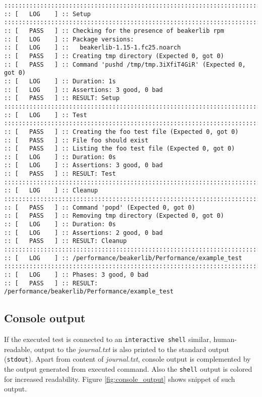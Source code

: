 \begin{minipage}{\linewidth}
\begin{lstlisting}[style=txt,caption={Example of journal.txt},label={lst:journaltxt_example}]
::::::::::::::::::::::::::::::::::::::::::::::::::::::::::::::::::::::::::::::::
:: [   LOG    ] :: Setup
::::::::::::::::::::::::::::::::::::::::::::::::::::::::::::::::::::::::::::::::
:: [   PASS   ] :: Checking for the presence of beakerlib rpm 
:: [   LOG    ] :: Package versions:
:: [   LOG    ] ::   beakerlib-1.15-1.fc25.noarch
:: [   PASS   ] :: Creating tmp directory (Expected 0, got 0)
:: [   PASS   ] :: Command 'pushd /tmp/tmp.3iXfiT4GiR' (Expected 0, got 0)
:: [   LOG    ] :: Duration: 1s
:: [   LOG    ] :: Assertions: 3 good, 0 bad
:: [   PASS   ] :: RESULT: Setup
::::::::::::::::::::::::::::::::::::::::::::::::::::::::::::::::::::::::::::::::
:: [   LOG    ] :: Test
::::::::::::::::::::::::::::::::::::::::::::::::::::::::::::::::::::::::::::::::
:: [   PASS   ] :: Creating the foo test file (Expected 0, got 0)
:: [   PASS   ] :: File foo should exist 
:: [   PASS   ] :: Listing the foo test file (Expected 0, got 0)
:: [   LOG    ] :: Duration: 0s
:: [   LOG    ] :: Assertions: 3 good, 0 bad
:: [   PASS   ] :: RESULT: Test
::::::::::::::::::::::::::::::::::::::::::::::::::::::::::::::::::::::::::::::::
:: [   LOG    ] :: Cleanup
::::::::::::::::::::::::::::::::::::::::::::::::::::::::::::::::::::::::::::::::
:: [   PASS   ] :: Command 'popd' (Expected 0, got 0)
:: [   PASS   ] :: Removing tmp directory (Expected 0, got 0)
:: [   LOG    ] :: Duration: 0s
:: [   LOG    ] :: Assertions: 2 good, 0 bad
:: [   PASS   ] :: RESULT: Cleanup
::::::::::::::::::::::::::::::::::::::::::::::::::::::::::::::::::::::::::::::::
:: [   LOG    ] :: /performance/beakerlib/Performance/example_test
::::::::::::::::::::::::::::::::::::::::::::::::::::::::::::::::::::::::::::::::
:: [   LOG    ] :: Phases: 3 good, 0 bad
:: [   PASS   ] :: RESULT: /performance/beakerlib/Performance/example_test

\end{lstlisting}
\end{minipage}

\subsection{Console output}
\label{console_out}
If the executed test is connected to an \texttt{interactive shell} similar, human-readable, output to the \textit{journal.txt} is also printed to the standard output (\texttt{stdout}). Apart from content of  \textit{journal.txt}, console output is complemented by the output generated from executed command. Also the \texttt{shell} output is colored for increased readability.  Figure \ref{fig:console_output} shows snippet of such output.


